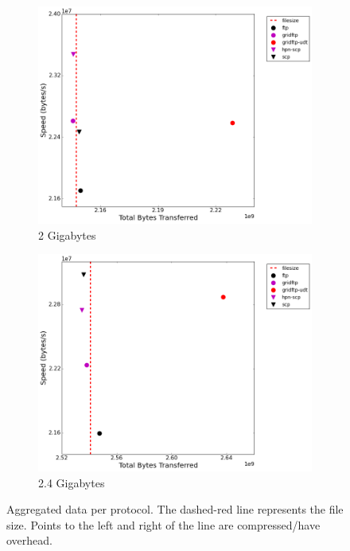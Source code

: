 \documentclass{sig-alternate-05-2015}
\begin{document}
\begin{figure}[t]
\begin{subfigure}{.3\linewidth}
	\includegraphics[width=\linewidth]{img/speed_bytes/2G.png}
	\caption{2 Gigabytes}
	\label{speed_bytes_2G}
	\end{subfigure}
	\begin{subfigure}{.3\linewidth}
	\includegraphics[width=\linewidth]{img/speed_bytes/2_4G.png}
	\caption{2.4 Gigabytes}
	\label{speed_bytes_2_4G}
	\end{subfigure}
\caption{Aggregated data per protocol. The dashed-red line represents the file size. Points to the left and right of the line are compressed/have overhead.}
\label{fig:aggregate}
\end{figure}
\end{document}
